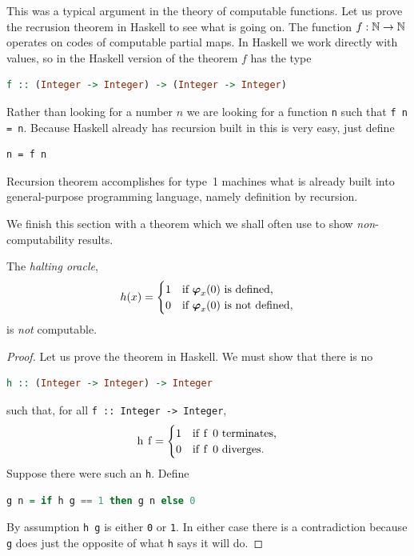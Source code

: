 This was a typical argument in the theory of computable functions. Let
us prove the recrusion theorem in Haskell to see what is going on. The
function $f : \mathbb{N} \to \mathbb{N}$ operates on codes of computable partial
maps. In Haskell we work directly with values, so in the Haskell
version of the theorem $f$ has the type
%
\begin{lstlisting}[language=Haskell]
f :: (Integer -> Integer) -> (Integer -> Integer)
\end{lstlisting}
%
Rather than looking for a number $n$ we are looking for a function
\lstinline!n! such that \lstinline!f n = n!. Because Haskell already
has recursion built in this is very easy, just define
%
\begin{lstlisting}
n = f n
\end{lstlisting}
%
Recursion theorem accomplishes for type~1 machines what is already
built into general-purpose programming language, namely definition by
recursion.

We finish this section with a theorem which we shall often use to show
\emph{non}-computability results.

\begin{theorem}
  The \emph{halting oracle},
  \begin{equation*}
    h(x) =
    \begin{cases}
      1 & \text{if $\text{\boldmath{$\varphi$}}_{x}(0)$ is defined,}\\
      0 & \text{if $\text{\boldmath{$\varphi$}}_{x}(0)$ is not defined,}
    \end{cases}
  \end{equation*}
  is \emph{not} computable.
\end{theorem}

\begin{proof}
  Let us prove the theorem in Haskell. We must show that there is no
  \begin{lstlisting}[language=Haskell]
h :: (Integer -> Integer) -> Integer
  \end{lstlisting}
  such that, for all \lstinline!f :: Integer -> Integer!,
  \begin{equation*}
    \text{\lstinline!h f!} =
    \begin{cases}
      \text{\lstinline!1!} & \text{if \lstinline!f 0! terminates,}\\
      \text{\lstinline!0!} & \text{if \lstinline!f 0! diverges.}
    \end{cases}
  \end{equation*}
  Suppose there were such an \lstinline!h!. Define
  \begin{lstlisting}[language=Haskell]
g n = if h g == 1 then g n else 0
  \end{lstlisting}
  By assumption \lstinline!h g! is either \lstinline!0! or
  \lstinline!1!. In either case there is a contradiction because
  \lstinline!g! does just the opposite of what \lstinline!h! says it
  will do.
\end{proof}



